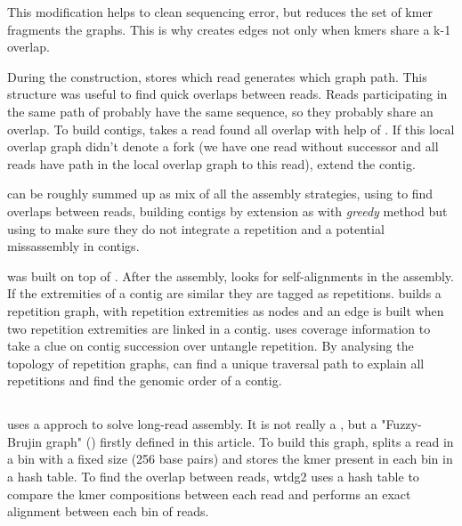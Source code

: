 \documentclass[main]{subfiles}
\begin{document}
This modification helps to clean sequencing error, but reduces the set of kmer fragments the \DBG graphs. This is why  creates edges not only when kmers share a k-1 overlap. 

During the  construction, \abruijn stores which read generates which graph path. This structure was useful to find quick overlaps between reads. Reads participating in the same path of  probably have the same sequence, so they probably share an overlap. To build contigs, \abruijn takes a read found all overlap with help of . If this local overlap graph didn't denote a fork (we have one read without successor and all reads have path in the local overlap graph to this read), \abruijn extend the contig.

\abruijn can be roughly summed up as mix of all the assembly strategies, using \DBG to find overlaps between reads, building contigs by extension as with \textit{greedy} method but using \OLC to make sure they do not integrate a repetition and a potential missassembly in contigs.

\flye was built on top of \abruijn. After the \abruijn assembly, \flye looks for self-alignments in the assembly. If the extremities of a contig are similar they are tagged as repetitions. \flye builds a repetition graph, with repetition extremities as nodes and an edge is built when two repetition extremities are linked in a contig. \flye uses coverage information to take a clue on contig succession over untangle repetition. By analysing the topology of repetition graphs, \flye can find a unique traversal path to explain all repetitions and find the genomic order of a contig.

\subsection{\wtdbg}

\wtdbg \cite{wtdbg2}  uses a \DBG approch to solve long-read assembly. It is not really a \DBG, but a "Fuzzy-Brujin graph" () firstly defined in this article. To build this graph, \wtdbg splits a read in a bin with a fixed size (256 base pairs) and stores the kmer present in each bin in a hash table.
To find the overlap between reads, wtdg2 uses a hash table to compare the kmer compositions between each read and performs an exact alignment between each bin of reads.
\end{document}
